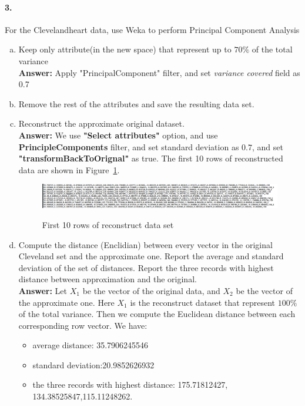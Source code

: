 \documentclass[11pt, final]{article}
\begin{document}
\paragraph{\textbf{3. }} For the Clevelandheart data, use Weka to perform Principal Component Analysis 
\begin{enumerate}[(a)]
\item Keep only attribute(in the new space) that represent up to $70\%$ of the total variance \\

\textbf{Answer: } Apply "PrincipalComponent" filter, and set \emph{variance covered} field as 0.7
\item Remove the rest of the attributes and save the resulting data set.
\item Reconstruct the approximate original dataset. \\

\textbf{Answer: } We use \textbf{"Select attributes"} option, and use \textbf{PrincipleComponents} filter, and set standard deviation as $0.7$, and set \textbf{"transformBackToOrignal"} as true. The first 10 rows of reconstructed data are shown in Figure~\ref{fig: reconstruct}.

\begin{figure}[!ht]
  \caption{First 10 rows of reconstruct data set}
  \centering
   \includegraphics[width=1\textwidth, height = 1.1 in]{Reconstruct.PNG}
   \label{fig: reconstruct}
\end{figure}


\item Compute the distance (Enclidian) between every vector in the original Cleveland set and the approximate one. Report the average and standard deviation of the set of distances. Report the three records with highest distance between approximation and the original. \\

\textbf{Answer: } Let $X_1$ be the vector of the original data, and $X_2$ be the vector of the approximate one. Here $X_1$ is the reconstruct dataset that represent $100\%$ of the total variance. Then we compute the Euclidean distance between each corresponding row vector. We have:
\begin{itemize}
\item average distance: 35.7906245546
\item standard deviation:20.9852626932
\item the three records with highest distance: 175.71812427, 134.38525847,115.11248262.
\end{itemize}
\end{enumerate}
\end{document}
